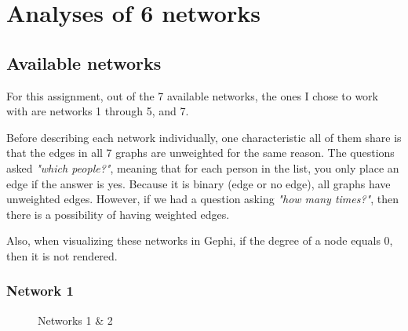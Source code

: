 \section{Analyses of 6 networks}
\subsection{Available networks}
For this assignment, out of the 7 available networks, the ones I chose to work with are networks 1 through 5, and 7.

Before describing each network individually, one characteristic all of them share is that the edges in all 7 graphs are unweighted for the same reason. The questions asked \textit{"which people?"}, meaning that for each person in the list, you only place an edge if the answer is yes. Because it is binary (edge or no edge), all graphs have unweighted edges. However, if we had a question asking \textit{"how many times?"}, then there is a possibility of having weighted edges.

Also, when visualizing these networks in Gephi, if the degree of a node equals 0, then it is not rendered.

\subsubsection{Network 1}
\begin{figure}
    \centering
    \qquad
    \caption{Networks 1 \& 2}
    \label{fig:1}
\end{figure}

